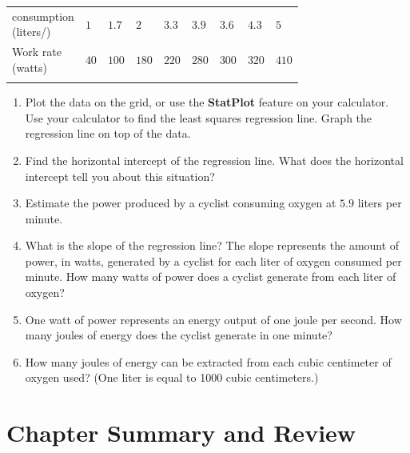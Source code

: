 \documentclass[10pt,]{book}
\makeatletter
\newcommand{\terminology}[1]{\textbf{#1}}
\theoremstyle{plain}
\theoremstyle{definition}
\theoremstyle{definition}
\theoremstyle{definition}
\theoremstyle{definition}
\numberwithin{equation}{part}
\newcommand{\hrulethin}  {\noalign{\hrule height 0.04em}}
\newcommand{\tablecelllines}[3]%
{\begin{tabular}[#2]{@{}#1@{}}#3\end{tabular}}
\makeatother
\begin{document}
\begin{exerciselist}
\begin{table}
\begin{tabular}{AlA}
{consumption\\
(liters/)}
&\(1\)&\(1.7\)&\(2\)&\(3.3\)&\(3.9\)&\(3.6\)&\(4.3\)&\(5\)\tabularnewline\hrulethin
\tablecelllines{l}{m}
{Work rate\\
(watts)}
&\(40\)&\(100\)&\(180\)&\(220\)&\(280\)&\(300\)&\(320\)&\(410\)\tabularnewline\hrulethin
\end{tabular}
\end{table}
 \leavevmode%
\begin{enumerate}[label=*\alph**]
\item\hypertarget{li-1506}{}Plot the data on the grid, or use the \terminology{StatPlot} feature on your calculator. Use your calculator to find the least squares regression line. Graph the regression line on top of the data.%
\item\hypertarget{li-1507}{}Find the horizontal intercept of the regression line. What does the horizontal intercept tell you about this situation?%
\item\hypertarget{li-1508}{}Estimate the power produced by a cyclist consuming oxygen at \(5.9\) liters per minute.%
\item\hypertarget{li-1509}{}What is the slope of the regression line? The slope represents the amount of power, in watts, generated by a cyclist for each liter of oxygen consumed per minute. How many watts of power does a cyclist generate from each liter of oxygen?%
\item\hypertarget{li-1510}{}One watt of power represents an energy output of one joule per second. How many joules of energy does the cyclist generate in one minute?%
\item\hypertarget{li-1511}{}How many joules of energy can be extracted from each cubic centimeter of oxygen used? (One liter is equal to 1000 cubic centimeters.)%
\end{enumerate}
%
\par\smallskip
\end{exerciselist}
\typeout{************************************************}
\typeout{************************************************}
\section[{Chapter Summary and Review}]{Chapter Summary and Review}\label{chap1-summary}
\typeout{************************************************}
\typeout{************************************************}
\end{document}
